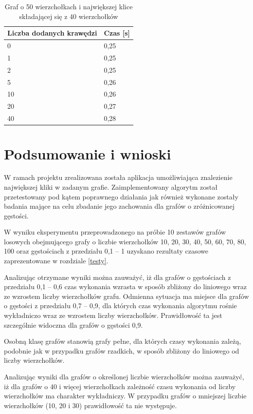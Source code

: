 \documentclass[12pt, a4paper]{article}
\begin{document}
\begin{table}[H]
\caption{Graf o 50 wierzchołkach i największej klice składającej się z 40 wierzchołków}
\begin{center}
    \begin{tabular}{|l|l|}
    \hline
    Liczba dodanych krawędzi & Czas [s] \\ \hline
    0 & 0,25 \\ \hline
    1 & 0,25 \\ \hline
    2 & 0,25 \\ \hline
    5 & 0,26 \\ \hline
    10 & 0,26 \\ \hline
    20 & 0,27 \\ \hline
    40 & 0,28 \\ \hline
    \end{tabular}
\end{center}
\end{table}

\section{Podsumowanie i wnioski}
W ramach projektu zrealizowana została aplikacja umożliwiająca znalezienie największej kliki w zadanym grafie. 
Zaimplementowany algorytm został przetestowany pod kątem poprawnego działania jak również wykonane 
zostały badania mające na celu zbadanie jego zachowania dla grafów o zróżnicowanej gęstości.

W wyniku eksperymentu przeprowadzonego na próbie 10 zestawów grafów losowych obejmującego grafy o liczbie wierzchołków 
10, 20, 30, 40, 50, 60, 70, 80, 100 oraz gęstościach z przedziału 0,1 -- 1 uzyskano rezultaty czasowe zaprezentowane w rozdziale \ref{testy}.

Analizując otrzymane wyniki można zauważyć, iż dla grafów o gęstościach z przedziału 0,1 -- 0,6 czas wykonania
wzrasta w sposób zbliżony do liniowego wraz ze wzrostem liczby wierzchołków grafu. 
Odmienna sytuacja ma miejsce dla grafów o gęstości z przedziału 0,7 -- 0,9, dla których czas wykonania 
algorytmu rośnie wykładniczo wraz ze wzrostem liczby wierzchołków. 
Prawidłowość ta jest szczególnie widoczna dla grafów o gęstości 0,9. 

Osobną klasę grafów stanowią grafy pełne, dla których czasy wykonania zależą, podobnie jak w przypadku grafów rzadkich, 
w sposób zbliżony do liniowego od liczby wierzchołków.

Analizując wyniki dla grafów o określonej liczbie wierzchołków można zauważyć, iż dla grafów o 40 i więcej wierzchołkach zależność czasu wykonania od liczby wierzchołków ma charakter wykładniczy. W przypadku grafów o mniejszej liczbie wierzchołków (10, 20  i 30) prawidłowość ta nie występuje.
\end{document}
